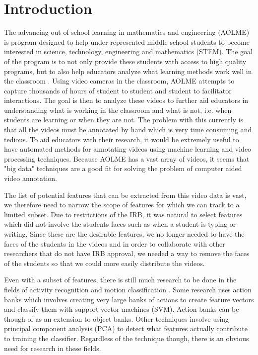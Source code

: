 \documentclass[
	submission,
	final,
	notitlepage,
	narroweqnarray,
	inline,
	twoside,
	]{ieee}
\begin{document}
\section{Introduction}
\PARstart The advancing out of school learning in mathematics and engineering (AOLME) is program designed to help under
represented middle school students to become interested in science, technology, engineering and mathematics (STEM). The goal of
the program is to not only provide these students with access to high quality programs, but to also help educators analyze
what learning methods work well in the classroom \cite{aolme_paper}. Using video cameras in the classroom, AOLME attempts to capture
thousands of hours of student to student and student to facilitator interactions. The goal is then to analyze these videos
to further aid educators in understanding what is working in the classroom and what is not, i.e. when students are learning or when they are not.
The problem with this currently is that
all the videos must be annotated by hand which is very time consuming and tedious. To aid educators with their research,
it would be extremely useful to have automated methods for annotating videos using machine learning and
video processing techniques. Because AOLME has a vast array of videos, it seems that "big data" techniques are a
good fit for solving the problem of computer aided video annotation.

The list of potential features that can be extracted from this video data is vast, we
therefore need to narrow the scope of features for
which we can track to a limited subset. Due to restrictions of the IRB,
it was natural to select features which did not involve the students faces
such as when a student is typing or writing. Since these are the desirable
features, we no longer needed to have the faces of the students in the videos
and in order to collaborate with other researchers that do not have IRB
approval, we needed a way to remove the faces of the students so that
we could more easily distribute the videos.

Even with a subset of features, there is still much research to be done
in the fields of activity recognition and motion classification \cite{machine_perception}.
Some research uses action banks \cite{action_bank} which involves
creating very large banks of actions to create feature vectors
and classify them with support vector machines (SVM). Action banks
can be though of as an extension to object banks. Other techniques involve
using principal component analysis (PCA) \cite{face_recog_book} to
detect what features actually contribute to training the classifier.
Regardless of the technique though, there is an obvious need for
research in these fields.
\end{document}
